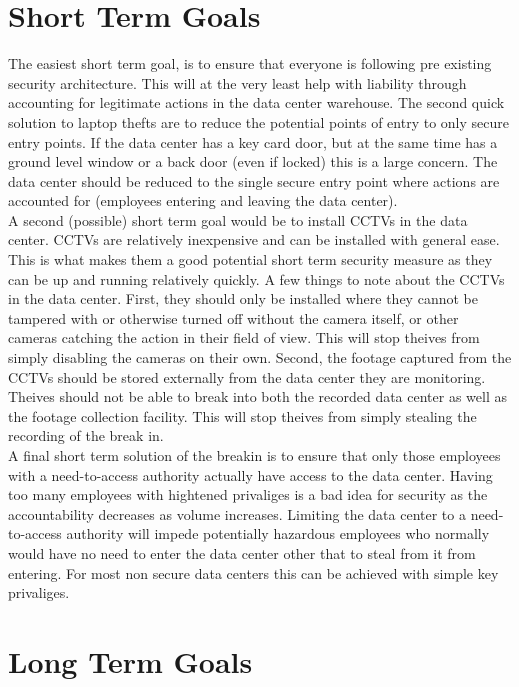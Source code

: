 \documentclass[paper=a4, fontsize=11pt]{scrartcl} %
\numberwithin{equation}{section} %
\numberwithin{figure}{section} %
\numberwithin{table}{section} %
\begin{document}
\section{Short Term Goals}

The easiest short term goal, is to ensure that everyone is following pre existing security architecture.
This will at the very least help with liability through accounting for legitimate actions in the
data center warehouse. The second quick solution to laptop thefts are to reduce the potential 
points of entry to only secure entry points. If the data center has a key card door, but at the same
time has a ground level window or a back door (even if locked) this is a large concern. The data center
should be reduced to the single secure entry point where actions are accounted for (employees entering
and leaving the data center).\\

A second (possible) short term goal would be to install CCTVs in the data center. CCTVs are relatively
inexpensive and can be installed with general ease. This is what makes them a good potential short term
security measure as they can be up and running relatively quickly. A few things to note about the CCTVs
in the data center. First, they should only be installed where they cannot be tampered with or otherwise
turned off without the camera itself, or other cameras catching the action in their field of view. This
will stop theives from simply disabling the cameras on their own. Second, the footage captured from the
CCTVs should be stored externally from the data center they are monitoring. Theives should not be able
to break into both the recorded data center as well as the footage collection facility. This will
stop theives from simply stealing the recording of the break in.\\

A final short term solution of the breakin is to ensure that only those employees with a need-to-access
authority actually have access to the data center. Having too many employees with hightened privaliges
is a bad idea for security as the accountability decreases as volume increases. Limiting the data
center to a need-to-access authority will impede potentially hazardous employees who normally would
have no need to enter the data center other that to steal from it from entering. For most non secure
data centers this can be achieved with simple key privaliges.

\section{Long Term Goals}
\end{document}
